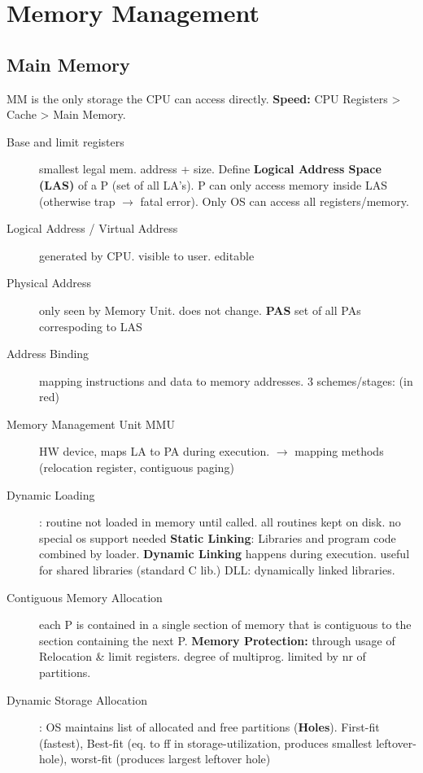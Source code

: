 \section*{Memory Management}
\subsection*{Main Memory}
MM is the only storage the CPU can access directly. \textbf{Speed:} CPU Registers > Cache > Main Memory.
\begin{description}
    \item[Base and limit registers] smallest legal mem. address + size. Define \textbf{Logical Address Space (LAS)} of a P (set of all LA's). P can only access memory inside LAS (otherwise trap $\rightarrow$ fatal error). Only OS can access all registers/memory. \\
    \item[Logical Address / Virtual Address] generated by CPU. visible to user. editable \\
    \item[Physical Address] only seen by Memory Unit. does not change. \textbf{PAS} set of  all PAs correspoding to LAS \\
    \item[Address Binding] mapping instructions and data to memory addresses. 3 schemes/stages: (in red) \\
    \item[Memory Management Unit MMU] HW device, maps LA to PA during execution. $\rightarrow$ mapping methods (relocation register, contiguous paging) \\
    \item[Dynamic Loading]: routine not loaded in memory until called. all routines kept on disk. no special os support needed \textbf{Static Linking}: Libraries and program code combined by loader. \textbf{Dynamic Linking} happens during execution. useful for shared libraries (standard C lib.) DLL: dynamically linked libraries. \\
    \item[Contiguous Memory Allocation] each P is contained in a single section of memory that is contiguous to the section containing the next P. \textbf{Memory Protection:} through usage of Relocation \& limit registers. degree of multiprog. limited by nr of partitions. \\
    \item[Dynamic Storage Allocation]: OS maintains list of allocated and free partitions (\textbf{Holes}). First-fit (fastest), Best-fit (eq. to ff in storage-utilization, produces smallest leftover-hole), worst-fit (produces largest leftover hole) \\

\end{description}
